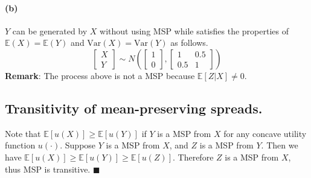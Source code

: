 \documentclass[11pt]{article}
\theoremstyle{definition}
\theoremstyle{boldtitle} %
\numberwithin{equation}{section}
\numberwithin{figure}{section}
\numberwithin{table}{section}
\begin{document}
\paragraph{(b)}
$Y$ can be generated by $X$ without using MSP while satisfies the properties of $\mathbb{E}(X) =\mathbb{E}(Y)$ and 
$\text{Var}(X) = \text{Var}(Y)$ as follows.
\begin{equation}
  \begin{bmatrix}
    X \\ Y
  \end{bmatrix}
  \sim N\left(
  \begin{bmatrix}
    1 \\ 0
  \end{bmatrix},
  \begin{bmatrix}
    1 & 0.5 \\ 
    0.5 & 1
  \end{bmatrix}
  \right)
\end{equation}
\textbf{Remark}: The process above is not a MSP because $\mathbb{E}[Z|X] \neq 0$.

\subsection*{Transitivity of mean-preserving spreads.}
Note that $\mathbb{E}[u(X)] \geq \mathbb{E}[u(Y)]$ if $Y$ is a MSP from $X$ for any concave utility function $u(\cdot)$. 
Suppose $Y$ is a MSP from $X$, and $Z$ is a MSP from $Y$.
Then we have $\mathbb{E}[u(X)] \geq \mathbb{E}[u(Y)] \geq \mathbb{E}[u(Z)]$.
Therefore $Z$ is a MSP from $X$, thus MSP is transitive.
\(\blacksquare\)
\end{document}
